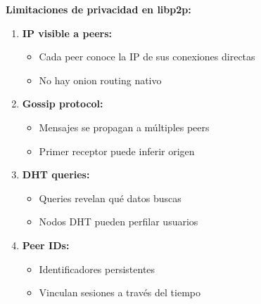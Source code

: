 \documentclass[11pt,a4paper,twoside]{book}
\theoremstyle{definition}
\theoremstyle{remark}
\begin{document}
\begin{advertencia}
\textbf{Limitaciones de privacidad en libp2p:}

\begin{enumerate}
    \item \textbf{IP visible a peers:}
    \begin{itemize}
        \item Cada peer conoce la IP de sus conexiones directas
        \item No hay onion routing nativo
    \end{itemize}
    
    \item \textbf{Gossip protocol:}
    \begin{itemize}
        \item Mensajes se propagan a múltiples peers
        \item Primer receptor puede inferir origen
    \end{itemize}
    
    \item \textbf{DHT queries:}
    \begin{itemize}
        \item Queries revelan qué datos buscas
        \item Nodos DHT pueden perfilar usuarios
    \end{itemize}
    
    \item \textbf{Peer IDs:}
    \begin{itemize}
        \item Identificadores persistentes
        \item Vinculan sesiones a través del tiempo
    \end{itemize}
\end{enumerate}
\end{advertencia}
\end{document}
